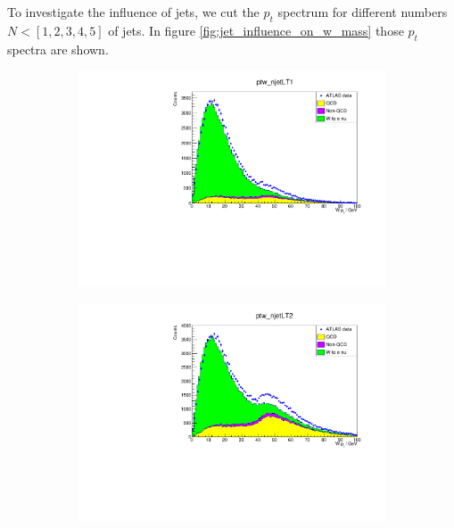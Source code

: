 \documentclass[11pt,a4paper,notitlepage]{scrartcl}
\begin{document}
To investigate the influence of jets, we cut the $p_t$ spectrum for different numbers $N<[1,2,3,4,5]$ of jets. In figure \ref{fig:jet_influence_on_w_mass} those $p_t$ spectra are shown.
\begin{figure}[h]
	\centering
	\begin{subfigure}{.32\linewidth}
		\includegraphics[width=\linewidth]{P1_pics/ptw_jets/ptw_njet0.pdf}
		\caption{}
	\end{subfigure}
	\begin{subfigure}{.32\linewidth}
		\includegraphics[width=\linewidth]{P1_pics/ptw_jets/ptw_njet1.pdf}
		\caption{}
	\end{subfigure}
	\begin{subfigure}{.32\linewidth}

\end{subfigure}
\end{figure}
\end{document}
